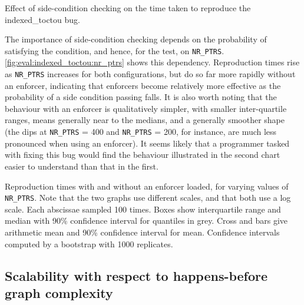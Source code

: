 \begin{sanefig}
  \caption{Effect of side-condition checking on the time taken to
    reproduce the indexed\_toctou bug.}
  \label{fig:eval:indexed_toctou:no_scs}
\end{sanefig}

The importance of side-condition checking depends on the probability
of satisfying the condition, and hence, for the  test,
on \texttt{NR\_PTRS}.  \autoref{fig:eval:indexed_toctou:nr_ptrs} shows
this dependency.  Reproduction times rise as \texttt{NR\_PTRS}
increases for both configurations, but do so far more rapidly without
an enforcer, indicating that {\technique} enforcers become relatively
more effective as the probability of a side condition passing falls.
It is also worth noting that the behaviour with an enforcer is
qualitatively simpler, with smaller inter-quartile ranges, means
generally near to the medians, and a generally smoother shape (the
dips at \texttt{NR\_PTRS} = 400 and \texttt{NR\_PTRS} = 200, for
instance, are much less pronounced when using an enforcer).  It seems
likely that a programmer tasked with fixing this bug would find the
behaviour illustrated in the second chart easier to understand than
that in the first.

\begin{sanefig}
  \caption{Reproduction times with and without an enforcer loaded, for
    varying values of \texttt{NR\_PTRS}.  Note that the two graphs use
    different scales, and that both use a log scale.  Each abscissae
    sampled 100 times.  Boxes show interquartile range and median with
    90\% confidence interval for quantiles in grey.  Cross and bars
    give arithmetic mean and 90\% confidence interval for mean.
    Confidence intervals computed by a bootstrap with 1000
    replicates. }
  \label{fig:eval:indexed_toctou:nr_ptrs}
\end{sanefig}

\subsection{Scalability with respect to happens-before graph complexity}


